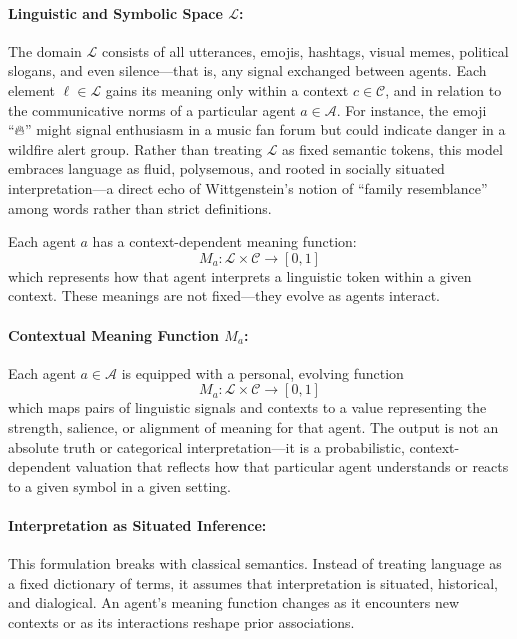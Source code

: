 \paragraph{Linguistic and Symbolic Space \( \mathcal{L} \):}
The domain \( \mathcal{L} \) consists of all utterances, emojis, hashtags, visual memes, political slogans, and even silence—that is, any signal exchanged between agents. Each element \( \ell \in \mathcal{L} \) gains its meaning only within a context \( c \in \mathcal{C} \), and in relation to the communicative norms of a particular agent \( a \in \mathcal{A} \). For instance, the emoji “🔥” might signal enthusiasm in a music fan forum but could indicate danger in a wildfire alert group. Rather than treating \( \mathcal{L} \) as fixed semantic tokens, this model embraces language as fluid, polysemous, and rooted in socially situated interpretation—a direct echo of Wittgenstein’s notion of “family resemblance” among words rather than strict definitions.

Each agent \( a \) has a context-dependent meaning function:
\[
M_a: \mathcal{L} \times \mathcal{C} \to [0,1]
\]
which represents how that agent interprets a linguistic token within a given context. These meanings are not fixed—they evolve as agents interact.

\paragraph{Contextual Meaning Function \( M_a \):}
Each agent \( a \in \mathcal{A} \) is equipped with a personal, evolving function
\[
M_a: \mathcal{L} \times \mathcal{C} \to [0,1]
\]
which maps pairs of linguistic signals and contexts to a value representing the strength, salience, or alignment of meaning for that agent. The output is not an absolute truth or categorical interpretation—it is a probabilistic, context-dependent valuation that reflects how that particular agent understands or reacts to a given symbol in a given setting.

\paragraph{Interpretation as Situated Inference:}
This formulation breaks with classical semantics. Instead of treating language as a fixed dictionary of terms, it assumes that interpretation is situated, historical, and dialogical. An agent’s meaning function changes as it encounters new contexts or as its interactions reshape prior associations.

